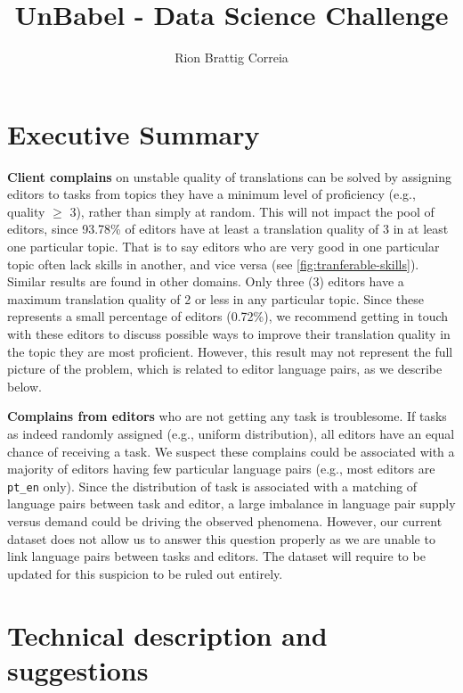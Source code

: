 \documentclass[10pt, a4paper]{article}
\title{UnBabel - Data Science Challenge}
\author{Rion Brattig Correia}
\date{}
\begin{document}
\maketitle


\section{Executive Summary}


\textbf{Client complains} on unstable quality of translations can be solved by assigning editors to tasks from topics they have a minimum level of proficiency (e.g., quality $\geq$ 3), rather than simply at random.
%
This will not impact the pool of editors, since 93.78\% of editors have at least a translation quality of 3 in at least one particular topic.
%
That is to say editors who are very good in one particular topic often lack skills in another, and vice versa (see \cref{fig:tranferable-skills}). Similar results are found in other domains.
%
Only three (3) editors have a maximum translation quality of 2 or less in any particular topic. Since these represents a small percentage of editors (0.72\%), we recommend getting in touch with these editors to discuss possible ways to improve their translation quality in the topic they are most proficient.
%
However, this result may not represent the full picture of the problem, which is related to editor language pairs, as we describe below.


\textbf{Complains from editors} who are not getting any task is troublesome. If tasks as indeed randomly assigned (e.g., uniform distribution), all editors have an equal chance of receiving a task.
%
We suspect these complains could be associated with a majority of editors having few particular language pairs (e.g., most editors are \texttt{pt\_en} only). Since the distribution of task is associated with a matching of language pairs between task and editor, a large imbalance in language pair supply versus demand could be driving the observed phenomena.
%
However, our current dataset does not allow us to answer this question properly as we are unable to link language pairs between tasks and editors.
%
The dataset will require to be updated for this suspicion to be ruled out entirely.



\section{Technical description and suggestions}
\end{document}
